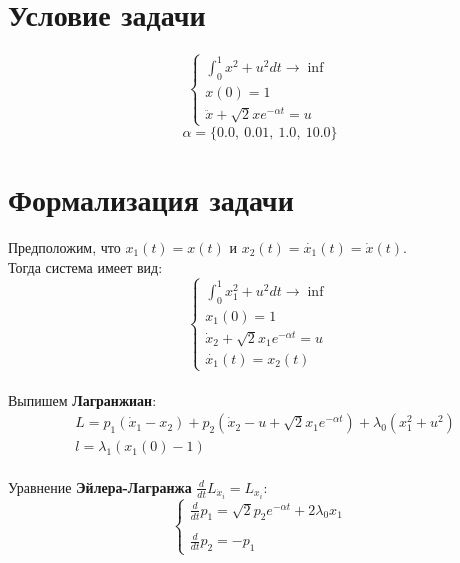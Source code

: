 \documentclass[12pt, a4paper]{article}
\begin{document}
	
	
	\section{Условие задачи}
	\vspace{0.5cm}
	\begin{equation*}
		\begin{cases}
			\int_{0}^{1}  x^2 + u^2 dt \to \inf \\
			x(0) = 1 \\
			\ddot{x} + \sqrt{2} x e^{-\alpha t} = u
   		\end{cases}
 	\end{equation*}
	$$
		\alpha = \{ 0.0,\ 0.01,\ 1.0,\ 10.0 \}
	$$
	
	\section{Формализация задачи}
	\vspace{0.5cm}
	Предположим, что $x_1(t) = x(t)$ и $x_2(t) = \dot{x_1}(t) = \dot{x}(t)$. \\
	Тогда система имеет вид: \\
	\begin{equation*}
		\begin{cases}
			\int_{0}^{1}  x_1^2 + u^2 dt \to \inf \\
			x_1(0) = 1 \\
			\dot{x}_2 + \sqrt{2} x_1 e^{-\alpha t} = u \\
			\dot{x_1}(t) = x_2(t)
   		\end{cases}
 	\end{equation*} \\
 	Выпишем \textbf{Лагранжиан}: \\
 	\begin{align*}
 		&L = p_1(\dot{x}_1 - x_2) + p_2(\dot{x}_2 - u + \sqrt{2} x_1 e^{-\alpha t})
 			+ \lambda_0(x_1^2 + u^2) \\
 		&l = \lambda_1(x_1(0) - 1)
 	\end{align*} \\
 	Уравнение \textbf{Эйлера-Лагранжа} $\frac{d}{dt} L_{\dot{x}_i} = L_{x_i}$: \\
 	\begin{equation*}
		\begin{cases}
			\frac{d}{dt} p_1 = \sqrt{2} p_2 e^{-\alpha t} + 2 \lambda_0 x_1 \\\\
			\frac{d}{dt} p_2 = -p_1
   		\end{cases}
 	\end{equation*} \\
\end{document}
